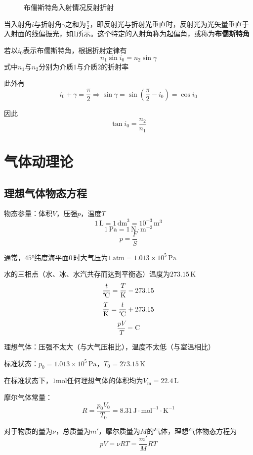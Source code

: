 \documentclass[12pt, a4paper, twoside]{ctexbook}
\begin{document}
\begin{figure}[H]
\begin{minipage}{0.48\linewidth}
        \caption{布儒斯特角入射情况反射折射}
        \label{fig:布儒斯特角入射情况反射折射}
    \end{minipage}
\end{figure}

当入射角$i$与折射角$\gamma$之和为$\frac{\pi}{2}$，即反射光与折射光垂直时，反射光为光矢量垂直于入射面的线偏振光，如\textcolor{blue}{\cref{fig:布儒斯特角入射情况反射折射}}所示。这个特定的入射角称为起偏角，或称为\textbf{布儒斯特角}

若以$i_0$表示布儒斯特角，根据折射定律有
$$
n_1\sin i_0=n_2\sin\gamma
$$
式中$n_1$与$n_2$分别为介质$1$与介质$2$的折射率

此外有
$$
i_0+\gamma=\frac{\pi}{2} \Rightarrow \sin\gamma=\sin\left(\frac{\pi}{2}-i_0\right)=\cos i_0
$$

因此
$$
\tan i_0=\frac{n_2}{n_1}
$$
\chapter{气体动理论}
\newpage
\section{理想气体物态方程}
{\sonti 物态参量}：体积$V$，压强$p$，温度$T$
$$
1\,\mathrm{L}=1\,\mathrm{dm}^3=10^{-3}\,\mathrm{m}^3
$$
$$
1\,\mathrm{Pa}=1\,\mathrm{N}\cdot\mathrm{m}^{-2}
$$
$$
p=\frac{F}{S}
$$

通常，$45°$纬度海平面$0\,$\textcelsius 时大气压为$1\,\mathrm{atm}=1.013\times10^5\,\mathrm{Pa}$

{\sonti 水的三相点}（水、冰、水汽共存而达到平衡态）温度为$273.15\,\mathrm{K}$
$$
\frac{t}{\text{\textcelsius}}=\frac{T}{\mathrm{K}}-273.15
$$
$$
\frac{T}{\mathrm{K}}=\frac{t}{\text{\textcelsius}}+273.15
$$
$$
\frac{pV}{T}=\mathrm{C}
$$

{\sonti 理想气体}：压强不太大（与大气压相比），温度不太低（与室温相比）

{\sonti 标准状态}：$p_0=1.013\times 10^5\,\mathrm{Pa}$，$T_0=273.15\,\mathrm{K}$

在标准状态下，$1\mathrm{mol}$任何理想气体的体积均为$V_\mathrm{m}=22.4\,\mathrm{L}$

{\sonti 摩尔气体常量}：
$$
R=\frac{p_0V_0}{T_0}=8.31\,\mathrm{J}\cdot\mathrm{mol}^{-1}\cdot\mathrm{K}^{-1}
$$

对于物质的量为$\nu$，总质量为$m'$，摩尔质量为$M$的气体，理想气体物态方程为
$$
pV=\nu RT=\frac{m'}{M}RT
$$
\end{document}
